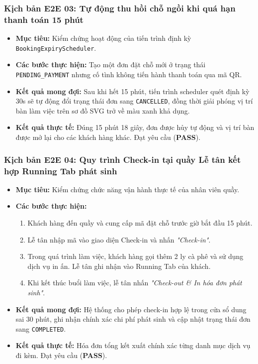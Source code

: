 \subsubsection*{Kịch bản E2E 03: Tự động thu hồi chỗ ngồi khi quá hạn thanh toán 15 phút}
\begin{itemize}
    \item \textbf{Mục tiêu:} Kiểm chứng hoạt động của tiến trình định kỳ \texttt{BookingExpiryScheduler}.
    \item \textbf{Các bước thực hiện:} Tạo một đơn đặt chỗ mới ở trạng thái \texttt{PENDING\_PAYMENT} nhưng cố tình không tiến hành thanh toán qua mã QR.
    \item \textbf{Kết quả mong đợi:} Sau khi hết 15 phút, tiến trình scheduler quét định kỳ 30s sẽ tự động đổi trạng thái đơn sang \texttt{CANCELLED}, đồng thời giải phóng vị trí bàn làm việc trên sơ đồ SVG trở về màu xanh khả dụng.
    \item \textbf{Kết quả thực tế:} Đúng 15 phút 18 giây, đơn được hủy tự động và vị trí bàn được mở lại cho các khách hàng khác. Đạt yêu cầu (\textbf{PASS}).
\end{itemize}

\subsubsection*{Kịch bản E2E 04: Quy trình Check-in tại quầy Lễ tân kết hợp Running Tab phát sinh}
\begin{itemize}
    \item \textbf{Mục tiêu:} Kiểm chứng chức năng vận hành thực tế của nhân viên quầy.
    \item \textbf{Các bước thực hiện:}
    \begin{enumerate}
        \item Khách hàng đến quầy và cung cấp mã đặt chỗ trước giờ bắt đầu 15 phút.
        \item Lễ tân nhập mã vào giao diện Check-in và nhấn \textit{"Check-in"}.
        \item Trong quá trình làm việc, khách hàng gọi thêm 2 ly cà phê và sử dụng dịch vụ in ấn. Lễ tân ghi nhận vào Running Tab của khách.
        \item Khi kết thúc buổi làm việc, lễ tân nhấn \textit{"Check-out \& In hóa đơn phát sinh"}.
    \end{enumerate}
    \item \textbf{Kết quả mong đợi:} Hệ thống cho phép check-in hợp lệ trong cửa sổ dung sai 30 phút, ghi nhận chính xác chi phí phát sinh và cập nhật trạng thái đơn sang \texttt{COMPLETED}.
    \item \textbf{Kết quả thực tế:} Hóa đơn tổng kết xuất chính xác từng danh mục dịch vụ đi kèm. Đạt yêu cầu (\textbf{PASS}).
\end{itemize}


